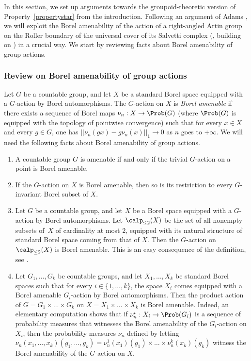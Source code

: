 In this section, we set up arguments towards the groupoid-theoretic version of Property~\eqref{propertystar} from the introduction. Following an argument of Adams \cite{Ada}, we will exploit the Borel amenability of the action of a right-angled Artin group on the Roller boundary of the universal cover of its Salvetti complex (\cite[Th.\,5.11]{Duc}, building on \cite{BCGNW}) in a crucial way. We start by reviewing facts about Borel amenability of group actions.\enlargethispage{\baselineskip}%

\subsubsection{Review on Borel amenability of group actions}\label{subsubsec:review}

Let $G$ be a countable group, and let $X$ be a standard Borel space equipped with a $G$-action by Borel automorphisms. The $G$-action on $X$ is \emph{Borel amenable} if there exists a sequence of Borel maps $\nu_n:X\to\Prob(G)$ (where $\Prob(G)$ is equipped with the topology of pointwise convergence) such that for every $x\in X$ and every $g\in G$, one has $||\nu_n(gx)-g\nu_n(x)||_1\to 0$ as $n$ goes to $+\infty$. We will need the following facts about Borel amenability of group actions.
\begin{enumerate}
\item A countable group $G$ is amenable if and only if the trivial $G$-action on a point is Borel amenable.
\item If the $G$-action on $X$ is Borel amenable, then so is its restriction to every $G$-invariant Borel subset of $X$.
\item Let $G$ be a countable group, and let $X$ be a Borel space equipped with a $G$\nobreakdash-action by Borel automorphisms. Let $\calp_{\le 2}(X)$ be the set of all nonempty subsets of~$X$ of cardinality at most $2$, equipped with its natural structure of standard Borel space coming from that of $X$. Then the $G$-action on $\calp_{\le 2}(X)$ is Borel amenable. This is an easy consequence of the definition, see \eg \cite[Lem.\,6.14]{HH}.
\item Let $G_1,\dots,G_k$ be countable groups, and let $X_1,\dots,X_k$ be standard Borel spaces such that for every $i\in\{1,\dots,k\}$, the space $X_i$ comes equipped with a Borel amenable $G_i$-action by Borel automorphisms. Then the product action of $G=G_1\times\dots\times G_k$ on $X=X_1\times\dots\times X_k$ is Borel amenable. Indeed, an elementary computation shows that if $\nu_n^i:X_i\to\Prob(G_i)$ is a sequence of probability measures that witnesses the Borel amenability of the $G_i$-action on $X_i$, then the probability measures $\nu_n$ defined by letting $\nu_n(x_1,\dots,x_k)(g_1,\dots,g_k)=\nu_n^1(x_1)(g_1)\times\dots\times\nu_n^k(x_k)(g_k)$ witness the Borel amenability of the $G$-action on $X$.
\end{enumerate}
